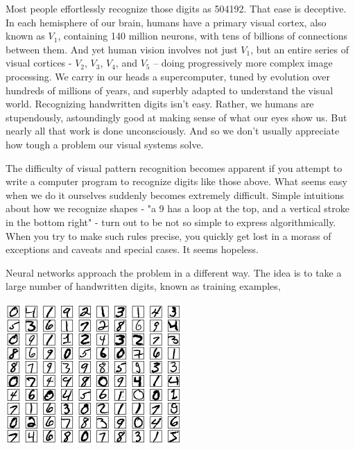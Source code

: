 \documentclass[a4paper,12pt]{report}%
\begin{document}
Most people effortlessly recognize those digits as 504192. That ease is deceptive. In each hemisphere of our brain, humans have a primary visual cortex, also known as $V_{1}$, containing 140 million neurons, with tens of billions of connections between them. And yet human vision involves not just $V_{1}$, but an entire series of visual cortices - $V_{2}$, $V_{3}$, $V_{4}$, and $V_{5}$ -- doing progressively more complex image processing. We carry in our heads a supercomputer, tuned by evolution over hundreds of millions of years, and superbly adapted to understand the visual world. Recognizing handwritten digits isn't easy. Rather, we humans are stupendously, astoundingly good at making sense of what our eyes show us. But nearly all that work is done unconsciously. And so we don't usually appreciate how tough a problem our visual systems solve.

The difficulty of visual pattern recognition becomes apparent if you attempt to write a computer program to recognize digits like those above. What seems easy when we do it ourselves suddenly becomes extremely difficult. Simple intuitions about how we recognize shapes - "a 9 has a loop at the top, and a vertical stroke in the bottom right" - turn out to be not so simple to express algorithmically. When you try to make such rules precise, you quickly get lost in a morass of exceptions and caveats and special cases. It seems hopeless.

Neural networks approach the problem in a different way. The idea is to take a large number of handwritten digits, known as training examples,

\begin{center}
 \includegraphics[width=0.8\linewidth]{images/mnist_100_digits.png}
\end{center}
\end{document}
